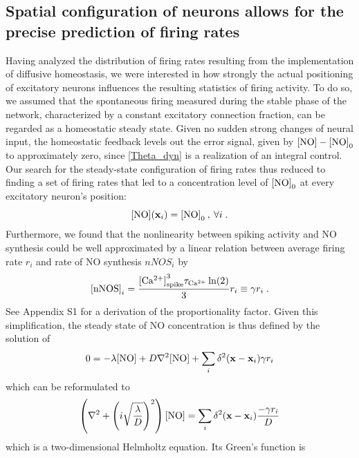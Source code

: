 \documentclass[10pt,letterpaper]{article}
\begin{document}
\subsection*{Spatial configuration of neurons allows for the precise prediction of firing rates}\label{Section_Rand_Mat_vs_Sim}
Having analyzed the distribution of firing rates resulting from the implementation of diffusive homeostasis, we were interested in how strongly the actual positioning of excitatory neurons influences the resulting statistics of firing activity. To do so, we assumed that the spontaneous firing measured during the stable phase of the network, characterized by a constant excitatory connection fraction, can be regarded as a homeostatic steady state. Given no sudden strong changes of neural input, the homeostatic feedback levels out the error signal, given by ${\rm [NO]} - {\rm [NO]}_0$ to approximately zero, since \eqref{Theta_dyn} is a realization of an integral control. Our search for the steady-state configuration of firing rates thus reduced to finding a set of firing rates that led to a concentration level of ${\rm [NO]}_0$ at every excitatory neuron's position:
\begin{equation}
{\rm [NO]}(\mathbf{x}_{i}) = {\rm [NO]}_0 \:, \: \forall i \; .
\label{NO_equil_cond}
\end{equation}
Furthermore, we found that the nonlinearity between spiking activity and NO synthesis could be well approximated by a linear relation between average firing rate $r_i$ and rate of NO synthesis $nNOS_i$ by
\begin{equation}
{\rm [nNOS]}_i = \frac{{\rm [Ca^{2+}]}^3_{\rm spike} \tau_{\rm Ca^{2+}}\ln(2)}{3} r_i \equiv \gamma r_i \; .
\label{simpl_nNOS}
\end{equation}
See Appendix S1 for a derivation of the proportionality factor. Given this simplification, the steady state of NO concentration is thus defined by the solution of
\begin{equation}
0 =-\lambda {\rm [NO]} + D \nabla^2 {\rm [NO]} + \sum_{i} \delta^2(\mathbf{x}-\mathbf{x}_{i}) \gamma r_i \label{simple_NO_dyn_with_diff}
\end{equation}
which can be reformulated to
\begin{equation}
\left(\nabla^2 + \left( i\sqrt{\frac{\lambda}{D}}\right)^2\right) {\rm [NO]} = \sum_{i} \delta^2(\mathbf{x}-\mathbf{x}_{i}) \frac{- \gamma r_i}{D}
\label{simple_NO_dyn_with_diff_equil_helmholtz}
\end{equation}
which is a two-dimensional Helmholtz equation. Its Green's function is
\end{document}
